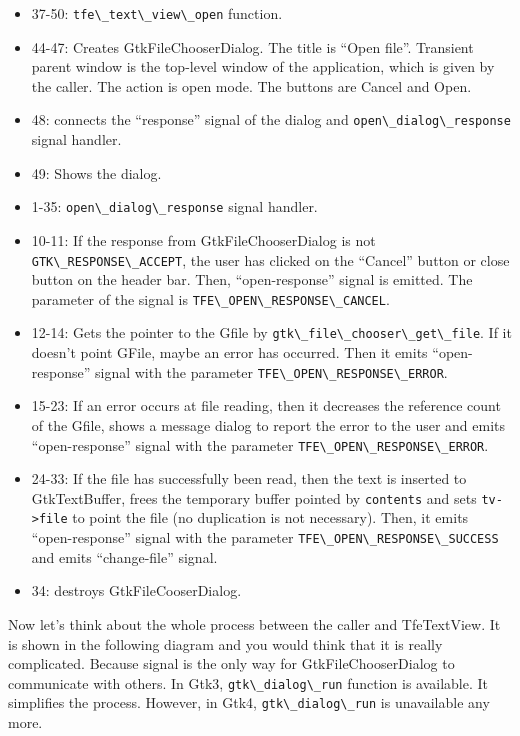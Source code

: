 \begin{itemize}
\tightlist
\item
  37-50: \passthrough{\lstinline!tfe\_text\_view\_open!} function.
\item
  44-47: Creates GtkFileChooserDialog. The title is ``Open file''.
  Transient parent window is the top-level window of the application,
  which is given by the caller. The action is open mode. The buttons are
  Cancel and Open.
\item
  48: connects the ``response'' signal of the dialog and
  \passthrough{\lstinline!open\_dialog\_response!} signal handler.
\item
  49: Shows the dialog.
\item
  1-35: \passthrough{\lstinline!open\_dialog\_response!} signal handler.
\item
  10-11: If the response from GtkFileChooserDialog is not
  \passthrough{\lstinline!GTK\_RESPONSE\_ACCEPT!}, the user has clicked
  on the ``Cancel'' button or close button on the header bar. Then,
  ``open-response'' signal is emitted. The parameter of the signal is
  \passthrough{\lstinline!TFE\_OPEN\_RESPONSE\_CANCEL!}.
\item
  12-14: Gets the pointer to the Gfile by
  \passthrough{\lstinline!gtk\_file\_chooser\_get\_file!}. If it doesn't
  point GFile, maybe an error has occurred. Then it emits
  ``open-response'' signal with the parameter
  \passthrough{\lstinline!TFE\_OPEN\_RESPONSE\_ERROR!}.
\item
  15-23: If an error occurs at file reading, then it decreases the
  reference count of the Gfile, shows a message dialog to report the
  error to the user and emits ``open-response'' signal with the
  parameter \passthrough{\lstinline!TFE\_OPEN\_RESPONSE\_ERROR!}.
\item
  24-33: If the file has successfully been read, then the text is
  inserted to GtkTextBuffer, frees the temporary buffer pointed by
  \passthrough{\lstinline!contents!} and sets
  \passthrough{\lstinline!tv->file!} to point the file (no duplication
  is not necessary). Then, it emits ``open-response'' signal with the
  parameter \passthrough{\lstinline!TFE\_OPEN\_RESPONSE\_SUCCESS!} and
  emits ``change-file'' signal.
\item
  34: destroys GtkFileCooserDialog.
\end{itemize}

Now let's think about the whole process between the caller and
TfeTextView. It is shown in the following diagram and you would think
that it is really complicated. Because signal is the only way for
GtkFileChooserDialog to communicate with others. In Gtk3,
\passthrough{\lstinline!gtk\_dialog\_run!} function is available. It
simplifies the process. However, in Gtk4,
\passthrough{\lstinline!gtk\_dialog\_run!} is unavailable any more.

